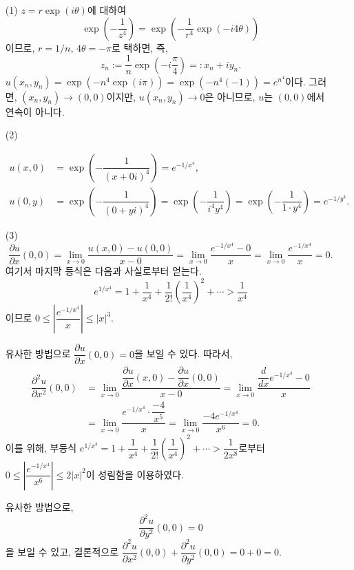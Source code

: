 \begin{itemize}
\item[(1)] $z=r\exp(i\theta)$에 대하여
\[
\exp\left(-\dfrac1{z^4}\right) = \exp\left( -\dfrac1{r^4} \exp(-i4\theta)\right)
\]
이므로, $r= 1/n$, $4\theta = -\pi$로 택하면, 즉,
\[
z_n := \dfrac1n \exp\left( -i\dfrac\pi4 \right) =: x_n + iy_n.
\]
$u(x_n,y_n) = \exp(-n^4\exp(i\pi)) = \exp(-n^4(-1)) = e^{n^4}$이다.
그러면, $(x_n, y_n)\to (0,0)$이지만, $u(x_n, y_n) \to 0$은 아니므로,
$u$는 $(0,0)$에서 연속이 아니다.

\item[(2)] 

\begin{align*}
u(x,0) &= \exp\left( - \dfrac1{(x+0i)^4} \right) = e^{-1/x^4}, \\
u(0,y) &= \exp\left( - \dfrac1{(0+yi)^4} \right) = \exp\left( - \dfrac1{i^4y^4}\right)
= \exp\left( - \dfrac1{1\cdot y^4} \right) = e^{-1/y^4}.
\end{align*}

\item[(3)] 
\[
\dfrac{\partial u}{\partial x}(0,0) =
\lim_{x\to 0} \dfrac{u(x,0) - u(0,0)}{x-0} = \lim_{x\to 0} \dfrac{e^{-1/x^4}-0}x
= \lim_{x\to 0} \dfrac{e^{-1/x^4}}x = 0.
\]
여기서 마지막 등식은 다음과 사실로부터 얻는다.
\[
e^{1/x^4} = 1 + \dfrac1{x^4} + \dfrac1{2!}\left(\dfrac1{x^4}\right)^2 
+ \cdots > \dfrac1{x^4}
\]
이므로 $0\le \left| \dfrac{e^{-1/x^4}}x\right| \le |x|^3$.

유사한 방법으로 $\dfrac{\partial u}{\partial x}(0,0) =0$을 보일 수 있다.
따라서,
\begin{align*}
\dfrac{\partial^2 u}{\partial x^2} (0,0)
&= \lim_{x\to0} \dfrac{ \dfrac{\partial u}{\partial x}(x,0) -\dfrac{\partial u}{\partial x}(0,0)}
{x-0} = \lim_{x\to0} \dfrac{\dfrac d{dx}e^{-1/x^4} - 0}x \\
&= \lim_{x\to0}  \dfrac{e^{-1/x^4}\cdot \dfrac{-4}{x^5}}x
= \lim_{x\to0} \dfrac{-4e^{-1/x^4}}{x^6} = 0.
\end{align*}
이를 위해, 부등식
$e^{1/x^4} = 1 + \dfrac1{x^4} + \dfrac1{2!}\left(\dfrac1{x^4}\right)^2 + \cdots
> \dfrac1{2x^8}$로부터 
$0\le \left| \dfrac{e^{-1/x^4}}{x^6}\right| \le 2|x|^2$이 성림함을 이용하였다.

유사한 방법으로,
\[
\dfrac{\partial^2u}{\partial y^2}(0,0)=0
\]
을 보일 수 있고, 결론적으로 
$\dfrac{\partial^2 u}{\partial x^2}(0,0) + \dfrac{\partial^2 u}{\partial y^2}(0,0) = 0+0=0$.
\end{itemize}

